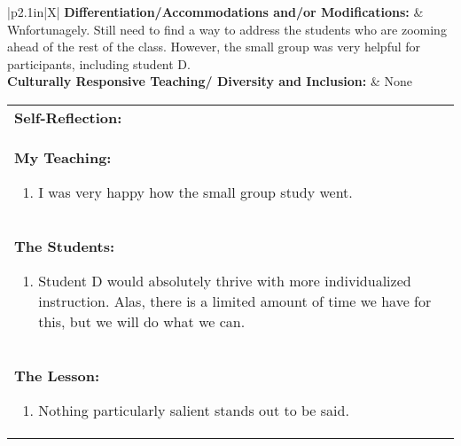 \vskip 6pt

\begin{small}
\begin{tabularx}{\linewidth}{|p{2.1in}|X|}
  \hline
  \textbf{Differentiation/Accommodations and/or Modifications: } & Wnfortunagely.  Still need to find a way to address the students who are zooming ahead of the rest of the class.  However, the small group was very helpful for participants, including  student D.\\
  \hline
  \textbf{Culturally Responsive Teaching/ Diversity and Inclusion: } & None \\ 
  \hline
\end{tabularx}

\vskip 6pt

\begin{tabularx}{\linewidth}{|X|}
  \hline
  \textbf{Self-Reflection:} \\
  \textbf{My Teaching:} 
  \begin{enumerate}
  \item I was very happy how the small group study went.
  \end{enumerate} \\
  
  \textbf{The Students:}
  \begin{enumerate}
  \item Student D would absolutely thrive with more individualized instruction.  Alas, there is a limited amount of time we have for this, but we will do what we can.
  \end{enumerate} \\
  
  \textbf{The Lesson:}
  \begin{enumerate}
  \item Nothing particularly salient stands out to be said.
  \end{enumerate} \\
  
  \hline
\end{tabularx}
\end{small}
